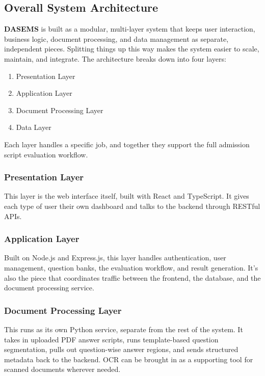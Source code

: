 \subsection{Overall System Architecture}

\textbf{DASEMS} is built as a modular, multi-layer system that keeps user interaction, business logic, document processing, and data management as separate, independent pieces. Splitting things up this way makes the system easier to scale, maintain, and integrate. The architecture breaks down into four layers:

\begin{enumerate}
    \item Presentation Layer
    \item Application Layer
    \item Document Processing Layer
    \item Data Layer
\end{enumerate}

Each layer handles a specific job, and together they support the full admission script evaluation workflow.

\subsubsection{Presentation Layer}

This layer is the web interface itself, built with React and TypeScript. It gives each type of user their own dashboard and talks to the backend through RESTful APIs.

\subsubsection{Application Layer}

Built on Node.js and Express.js, this layer handles authentication, user management, question banks, the evaluation workflow, and result generation. It's also the piece that coordinates traffic between the frontend, the database, and the document processing service.

\subsubsection{Document Processing Layer}

This runs as its own Python service, separate from the rest of the system. It takes in uploaded PDF answer scripts, runs template-based question segmentation, pulls out question-wise answer regions, and sends structured metadata back to the backend. OCR can be brought in as a supporting tool for scanned documents wherever needed.

